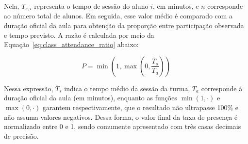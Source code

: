 Nela, $T_{s,i}$ representa o tempo de sessão do aluno $i$, em minutos, e $n$ corresponde ao número total de alunos. Em seguida, esse valor médio é comparado com a duração oficial da aula para obtenção da proporção entre participação observada e tempo previsto. A razão é calculada por meio da Equação~\ref{eq:class_attendance_ratio} abaixo:

\begin{equation}\label{eq:class_attendance_ratio}
P = \min\left(1, \max\left(0, \frac{\bar{T}_s}{T_a}\right)\right)
\end{equation}

Nessa expressão, $\bar{T}_s$ indica o tempo médio da sessão da turma, $T_a$ corresponde à duração oficial da aula (em minutos), enquanto as funções $\min(1, \cdot)$ e $\max(0, \cdot)$ garantem respectivamente, que o resultado não ultrapasse 100\% e não assuma valores negativos. Dessa forma, o valor final da taxa de presença é normalizado entre 0 e 1, sendo comumente apresentado com três casas decimais de precisão.


% 


